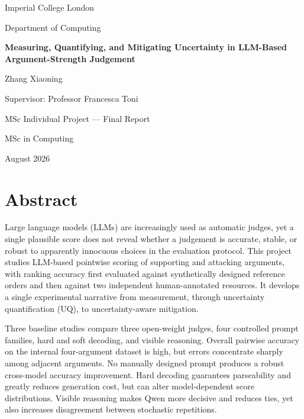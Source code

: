 \documentclass[11pt,twoside,a4paper]{report}
\newcommand{\reporttitle}{Measuring, Quantifying, and Mitigating Uncertainty in LLM-Based Argument-Strength Judgement}
\newcommand{\reportauthor}{Zhang Xiaoning}
\newcommand{\supervisorname}{Professor Francesca Toni}
\newcommand{\degreeprogramme}{MSc in Computing}
\newcommand{\universityname}{Imperial College London}
\newcommand{\departmentname}{Department of Computing}
\begin{document}

\begin{titlepage}
  \centering
  \vspace*{1.5cm}
  {\Large \universityname\par}
  \vspace{0.3cm}
  {\large \departmentname\par}
  \vfill
  {\huge\bfseries \reporttitle\par}
  \vspace{1.5cm}
  {\Large \reportauthor\par}
  \vspace{0.8cm}
  {\large Supervisor: \supervisorname\par}
  \vfill
  {\large MSc Individual Project --- Final Report\par}
  {\large \degreeprogramme\par}
  \vspace{0.5cm}
  {\large August 2026\par}
\end{titlepage}

\setcounter{page}{1}

\chapter*{Abstract}

Large language models (LLMs) are increasingly used as automatic judges, yet a
single plausible score does not reveal whether a judgement is accurate, stable, or
robust to apparently innocuous choices in the evaluation protocol.  This project
studies LLM-based pointwise scoring of supporting and attacking arguments, with
ranking accuracy first evaluated against synthetically designed reference orders and
then against two independent human-annotated resources.  It develops a single
experimental narrative from measurement, through uncertainty quantification (UQ),
to uncertainty-aware mitigation.

Three baseline studies compare three open-weight judges, four controlled prompt
families, hard and soft decoding, and visible reasoning.  Overall pairwise accuracy
on the internal four-argument dataset is high, but errors concentrate sharply among
adjacent arguments.  No manually designed prompt produces a robust cross-model
accuracy improvement.  Hard decoding guarantees parseability and greatly reduces
generation cost, but can alter model-dependent score distributions.  Visible
reasoning makes Qwen more decisive and reduces ties, yet also increases disagreement
between stochastic repetitions.
\end{document}
